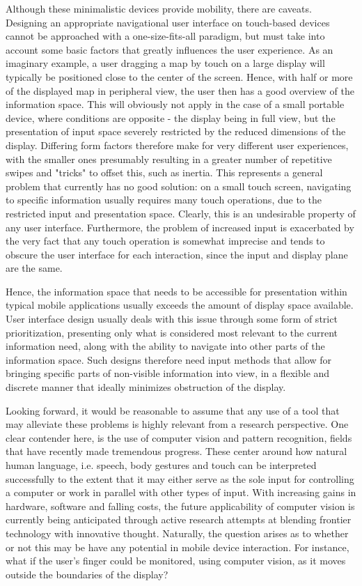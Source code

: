 Although these minimalistic devices provide mobility, there are caveats. Designing an appropriate navigational user interface on touch-based devices cannot be approached with a one-size-fits-all paradigm, but must take into account some basic factors that greatly influences the user experience. As an imaginary example, a user dragging a map by touch on a large display will typically be positioned close to the center of the screen. Hence, with half or more of the displayed map in peripheral view, the user then has a good overview of the information space. This will obviously not apply in the case of a small portable device, where conditions are opposite - the display being in full view, but the presentation of input space severely restricted by the reduced dimensions of the display. Differing form factors therefore make for very different user experiences, with the smaller ones presumably resulting in a greater number of repetitive swipes and "tricks" to offset this, such as inertia. This represents a general problem that currently has no good solution: on a small touch screen, navigating to specific information usually requires many touch operations, due to the restricted input and presentation space. Clearly, this is an undesirable property of any user interface. Furthermore, the problem of increased input is exacerbated by the very fact that any touch operation is somewhat imprecise and tends to obscure the user interface for each interaction, since the input and display plane are the same. 

Hence, the information space that needs to be accessible for presentation within typical mobile applications usually exceeds the amount of display space available. User interface design usually deals with this issue through some form of strict prioritization,  presenting only what is considered most relevant to the current information need, along with the ability to navigate into other parts of the information space. Such designs therefore need input methods that allow for bringing specific parts of non-visible information into view, in a flexible and discrete manner that ideally minimizes obstruction of the display.

Looking forward, it would be reasonable to assume that any use of a tool that may alleviate these problems is highly relevant from a  research perspective. One clear contender here, is the use of  computer vision and pattern recognition, fields that have recently made tremendous progress.  These center around how natural human language, i.e. speech, body gestures and touch can be interpreted successfully to the extent that it may either serve as the sole input for controlling a computer or work in parallel with other types of input. With increasing gains in hardware, software and falling costs, the future applicability of computer vision is currently being anticipated through active research attempts at blending frontier technology with innovative thought. Naturally, the question arises as to whether or not this may be have any potential in mobile device interaction. For instance, what if the user's finger could be monitored, using computer vision, as it moves outside the boundaries of the display?\\

